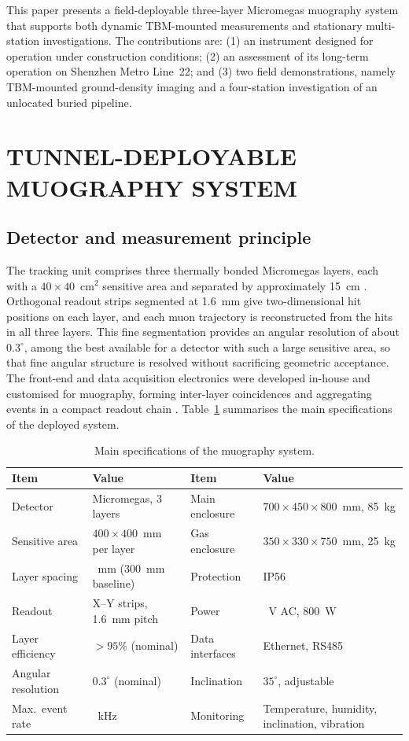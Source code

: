 \documentclass{WTC2027}
\begin{document}
This paper presents a field-deployable three-layer Micromegas muography system that supports both dynamic TBM-mounted measurements and stationary multi-station investigations. The contributions are: (1) an instrument designed for operation under construction conditions; (2) an assessment of its long-term operation on Shenzhen Metro Line~22; and (3) two field demonstrations, namely TBM-mounted ground-density imaging and a four-station investigation of an unlocated buried pipeline. 

\section{TUNNEL-DEPLOYABLE MUOGRAPHY SYSTEM}
\subsection{Detector and measurement principle}
The tracking unit comprises three thermally bonded Micromegas layers, each with a $40\times40$~cm$^2$ sensitive area and separated by approximately 15~cm \autocite{feng2021thermal}. Orthogonal readout strips segmented at 1.6~mm give two-dimensional hit positions on each layer, and each muon trajectory is reconstructed from the hits in all three layers. This fine segmentation provides an angular resolution of about $0.3^\circ$, among the best available for a detector with such a large sensitive area, so that fine angular structure is resolved without sacrificing geometric acceptance. The front-end and data acquisition electronics were developed in-house and customised for muography, forming inter-layer coincidences and aggregating events in a compact readout chain \autocite{wang2025readout,liu2025backend}. Table~\ref{tab:specs} summarises the main specifications of the deployed system.

\begin{table}[htbp]
\caption{Main specifications of the muography system.}
\label{tab:specs}\centering
\fontsize{10pt}{12pt}\selectfont
\renewcommand{\arraystretch}{1.12}
\setlength{\tabcolsep}{5pt}
\begin{tabularx}{\textwidth}{@{}l>{\raggedright\arraybackslash}Xl>{\raggedright\arraybackslash}X@{}}
\toprule
Item & Value & Item & Value\\
\midrule
Detector & Micromegas, 3 layers & Main enclosure & $700\times450\times800$~mm, 85~kg\\
Sensitive area & $400\times400$~mm per layer & Gas enclosure & $350\times330\times750$~mm, 25~kg\\
Layer spacing & 150~mm (300~mm baseline) & Protection & IP56\\
Readout & X--Y strips, 1.6~mm pitch & Power & 220~V AC, 800~W\\
Layer efficiency & $>95\%$ (nominal) & Data interfaces & Ethernet, RS485\\
Angular resolution & $0.3^\circ$ (nominal) & Inclination & $35^\circ$, adjustable\\
Max.\ event rate & 3~kHz & Monitoring & Temperature, humidity, inclination, vibration\\
\bottomrule
\end{tabularx}
\end{table}
\end{document}
